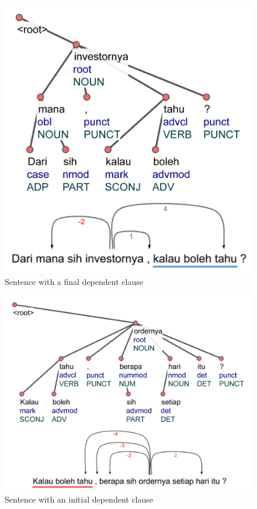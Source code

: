 \documentclass[10pt, a4paper, conference, compsocconf]{IEEEtran}
\begin{document}
\begin{figure}
  \centering
  \includegraphics[width=0.55\linewidth] {pics/ls1436.jpg} 
	\caption{Sentence with a final dependent clause}
	\label{fig:ls1436} 
\end{figure}
%
\begin{figure}
  \centering
  \includegraphics[width=0.75\linewidth]{pics/ls1460.jpg} 
	\caption{Sentence with an initial dependent clause}
	\label{fig:ls1460} 
\end{figure}
\end{document}
